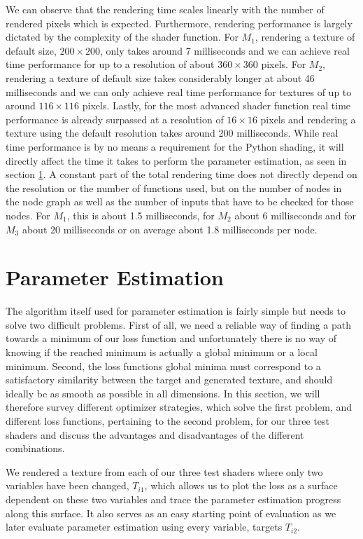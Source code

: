 We can observe that the rendering time scales linearly with the number of rendered pixels which is expected. Furthermore, rendering performance is largely dictated by the complexity of the shader function. For $M_1$, rendering a texture of default size, $200\times 200$, only takes around 7 milliseconds and we can achieve real time performance for up to a resolution of about $360\times 360$ pixels. For $M_2$, rendering a texture of default size takes considerably longer at about 46 milliseconds and we can only achieve real time performance for textures of up to around $116\times 116$ pixels. Lastly, for the most advanced shader function real time performance is already surpassed at a resolution of $16\times 16$ pixels and rendering a texture using the default resolution takes around 200 milliseconds. While real time performance is by no means a requirement for the Python shading, it will directly affect the time it takes to perform the parameter estimation, as seen in section \ref{sec:EvalParameterEstimation}. A constant part of the total rendering time does not directly depend on the resolution or the number of functions used, but on the number of nodes in the node graph as well as the number of inputs that have to be checked for those nodes. For $M_1$, this is about 1.5 milliseconds, for $M_2$ about 6 milliseconds and for $M_3$ about 20 milliseconds or on average about 1.8 milliseconds per node. 

\section{Parameter Estimation}\label{sec:EvalParameterEstimation}

The algorithm itself used for parameter estimation is fairly simple but needs to solve two difficult problems. First of all, we need a reliable way of finding a path towards a minimum of our loss function and unfortunately there is no way of knowing if the reached minimum is actually a global minimum or a local minimum. Second, the loss functions global minima must correspond to a satisfactory similarity between the target and generated texture, and should ideally be as smooth as possible in all dimensions. In this section, we will therefore survey different optimizer strategies, which solve the first problem, and different loss functions, pertaining to the second problem, for our three test shaders and discuss the advantages and disadvantages of the different combinations.

We rendered a texture from each of our three test shaders where only two variables have been changed, $T_{i1}$, which allows us to plot the loss as a surface dependent on these two variables and trace the parameter estimation progress along this surface. It also serves as an easy starting point of evaluation as we later evaluate parameter estimation using every variable, targets $T_{i2}$.

